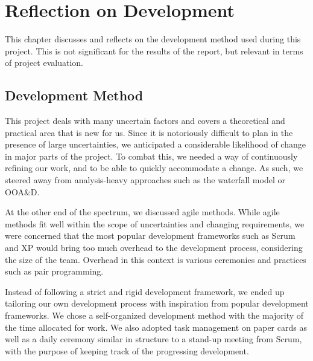 \chapter{Reflection on Development}\label{chap:devmethodreflection}
This chapter discusses and reflects on the development method used during this project. This is not significant for the results of the report, but relevant in terms of project evaluation.

\section{Development Method}
This project deals with many uncertain factors and covers a theoretical and practical area that is new for us. Since it is notoriously difficult to plan in the presence of large uncertainties, we anticipated a considerable likelihood of change in major parts of the project. To combat this, we needed a way of continuously refining our work, and to be able to quickly accommodate a change. As such, we steered away from analysis-heavy approaches such as the waterfall model or OOA\&D\@.

At the other end of the spectrum, we discussed agile methods. While agile methods fit well within the scope of uncertainties and changing requirements, we were concerned that the most popular development frameworks such as Scrum and XP would bring too much overhead to the development process, considering the size of the team. Overhead in this context is various ceremonies and practices such as pair programming. %

Instead of following a strict and rigid development framework, we ended up tailoring our own development process with inspiration from popular development frameworks. We chose a self-organized development method with the majority of the time allocated for work. We also adopted task management on paper cards as well as a daily ceremony similar in structure to a stand-up meeting from Scrum, with the purpose of keeping track of the progressing development.

